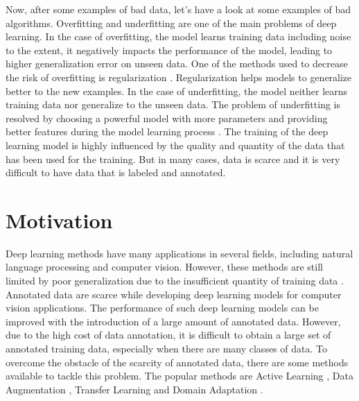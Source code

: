Now, after some examples of bad data, let's have a look at some examples of bad algorithms. Overfitting and underfitting are one of the main problems of deep learning. In the case of overfitting, the model learns training data including noise to the extent, it negatively impacts the performance of the model, leading to higher generalization error on unseen data. One of the methods used to decrease the risk of overfitting is regularization \cite{kukacka2017regularization}. Regularization helps models to generalize better to the new examples. In the case of underfitting, the model neither learns training data nor generalize to the unseen data. The problem of underfitting is resolved by choosing a powerful model with more parameters and providing better features during the model learning process \cite{10.5555/3153997}. The training of the deep learning model is highly influenced by the quality and quantity of the data that has been used for the training. But in many cases, data is scarce and it is very difficult to have data that is labeled and annotated.





\section{Motivation}\label{motivation}

Deep learning methods have many applications in several fields, including natural language processing and computer vision. However, these methods are still limited by poor generalization due to the insufficient quantity of training data \cite{8978087}. Annotated data are scarce while developing deep learning models for computer vision applications. The performance of such deep learning models can be improved with the introduction of a large amount of annotated data. However, due to the high cost of data annotation, it is difficult to obtain a large set of annotated training data, especially when there are many classes of data. To overcome the obstacle of the scarcity of annotated data, there are some methods available to tackle this problem. The popular methods are Active Learning \cite{hemmer2020deal}, Data Augmentation \cite{Shorten.2019}, Transfer Learning \cite{zhuang2020comprehensive} and Domain Adaptation \cite{redko2020survey}. 

